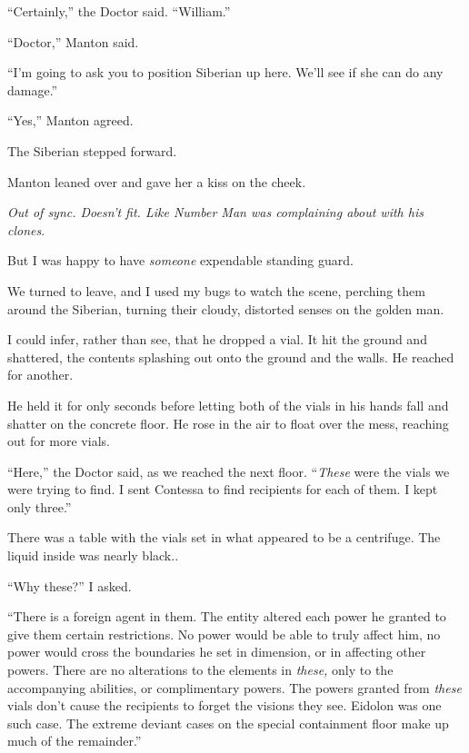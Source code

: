 ``Certainly,'' the Doctor said.  ``William.''



``Doctor,'' Manton said.



``I'm going to ask you to position Siberian up here.  We'll see if she can do any damage.''



``Yes,'' Manton agreed.



The Siberian stepped forward.



Manton leaned over and gave her a kiss on the cheek.



\emph{Out of sync.  Doesn't fit.  Like Number Man was complaining about with his clones}.



But I was happy to have \emph{someone} expendable standing guard.



We turned to leave, and I used my bugs to watch the scene, perching them around the Siberian, turning their cloudy, distorted senses on the golden man.



I could infer, rather than see, that he dropped a vial.  It hit the ground and shattered, the contents splashing out onto the ground and the walls.  He reached for another.



He held it for only seconds before letting both of the vials in his hands fall and shatter on the concrete floor.  He rose in the air to float over the mess, reaching out for more vials.



``Here,'' the Doctor said, as we reached the next floor.  ``\emph{These }were the vials we were trying to find.  I sent Contessa to find recipients for each of them.  I kept only three.''



There was a table with the vials set in what appeared to be a centrifuge.  The liquid inside was nearly black..



``Why these?''  I asked.



``There is a foreign agent in them.  The entity altered each power he granted to give them certain restrictions.  No power would be able to truly affect him, no power would cross the boundaries he set in dimension, or in affecting other powers.  There are no alterations to the elements in \emph{these, }only to the accompanying abilities, or complimentary powers.  The powers granted from \emph{these} vials don't cause the recipients to forget the visions they see.  Eidolon was one such case.  The extreme deviant cases on the special containment floor make up much of the remainder.''



